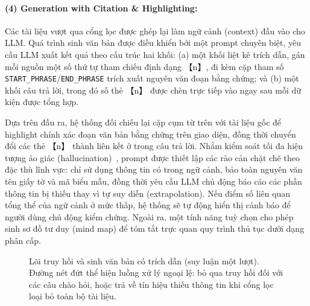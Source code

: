 \documentclass[11pt]{article}
\begin{document}
\paragraph{(4) Generation with Citation \& Highlighting: }
Các tài liệu vượt qua cổng lọc được ghép lại làm ngữ cảnh (context) đầu vào cho LLM. Quá trình sinh văn bản được điều khiển bởi một prompt chuyên biệt, yêu cầu LLM xuất kết quả theo cấu trúc hai khối: (a) một khối liệt kê trích dẫn, gán mỗi nguồn một số thứ tự tham chiếu định dạng 【n】, đi kèm cặp tham số \texttt{START\_PHRASE}/\texttt{END\_PHRASE} trích xuất nguyên văn đoạn bằng chứng; và (b) một khối câu trả lời, trong đó số thẻ 【n】 được chèn trực tiếp vào ngay sau mỗi dữ kiện được tổng hợp. 

Dựa trên đầu ra, hệ thống đối chiếu lại cặp cụm từ trên với tài liệu gốc để highlight chính xác đoạn văn bản bằng chứng trên giao diện, đồng thời chuyển đổi các thẻ 【n】 thành liên kết ở trong câu trả lời. Nhằm kiểm soát tối đa hiện tượng ảo giác (hallucination)~\citep{Huang_2025}, prompt được thiết lập các rào cản chặt chẽ theo đặc thù lĩnh vực: chỉ sử dụng thông tin có trong ngữ cảnh, bảo toàn nguyên văn tên giấy tờ và mã biểu mẫu, đồng thời yêu cầu LLM chủ động báo cáo các phần thông tin bị thiếu thay vì tự suy diễn (extrapolation). Nếu điểm số liên quan tổng thể của ngữ cảnh ở mức thấp, hệ thống sẽ tự động hiển thị cảnh báo để người dùng chủ động kiểm chứng. Ngoài ra, một tính năng tuỳ chọn cho phép sinh sơ đồ tư duy (mind map) để tóm tắt trực quan quy trình thủ tục dưới dạng phân cấp.

\begin{figure}[H]
\centering
{}
\caption{Lõi truy hồi và sinh văn bản có trích dẫn (suy luận một lượt). Đường nét đứt thể hiện luồng xử lý ngoại lệ: bỏ qua truy hồi đối với các câu chào hỏi, hoặc trả về tín hiệu thiếu thông tin khi cổng lọc loại bỏ toàn bộ tài liệu.}
\label{fig:rag}
\end{figure}
\end{document}
